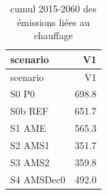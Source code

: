 \documentclass[]{article}
\begin{document}
\begin{longtable}[]{@{}lr@{}}
\caption{cumul 2015-2060 des émissions liées au
chauffage}\tabularnewline
\toprule
\begin{minipage}[b]{0.17\columnwidth}\raggedright\strut
scenario\strut
\end{minipage} & \begin{minipage}[b]{0.09\columnwidth}\raggedleft\strut
V1\strut
\end{minipage}\tabularnewline
\midrule
\endfirsthead
\toprule
\begin{minipage}[b]{0.17\columnwidth}\raggedright\strut
scenario\strut
\end{minipage} & \begin{minipage}[b]{0.09\columnwidth}\raggedleft\strut
V1\strut
\end{minipage}\tabularnewline
\midrule
\endhead
\begin{minipage}[t]{0.17\columnwidth}\raggedright\strut
S0 P0\strut
\end{minipage} & \begin{minipage}[t]{0.09\columnwidth}\raggedleft\strut
698.8\strut
\end{minipage}\tabularnewline
\begin{minipage}[t]{0.17\columnwidth}\raggedright\strut
S0b REF\strut
\end{minipage} & \begin{minipage}[t]{0.09\columnwidth}\raggedleft\strut
651.7\strut
\end{minipage}\tabularnewline
\begin{minipage}[t]{0.17\columnwidth}\raggedright\strut
S1 AME\strut
\end{minipage} & \begin{minipage}[t]{0.09\columnwidth}\raggedleft\strut
565.3\strut
\end{minipage}\tabularnewline
\begin{minipage}[t]{0.17\columnwidth}\raggedright\strut
S2 AMS1\strut
\end{minipage} & \begin{minipage}[t]{0.09\columnwidth}\raggedleft\strut
351.7\strut
\end{minipage}\tabularnewline
\begin{minipage}[t]{0.17\columnwidth}\raggedright\strut
S3 AMS2\strut
\end{minipage} & \begin{minipage}[t]{0.09\columnwidth}\raggedleft\strut
359.8\strut
\end{minipage}\tabularnewline
\begin{minipage}[t]{0.17\columnwidth}\raggedright\strut
S4 AMSDec0\strut
\end{minipage} & \begin{minipage}[t]{0.09\columnwidth}\raggedleft\strut
492.0\strut
\end{minipage}\tabularnewline
\bottomrule
\end{longtable}
\end{document}
